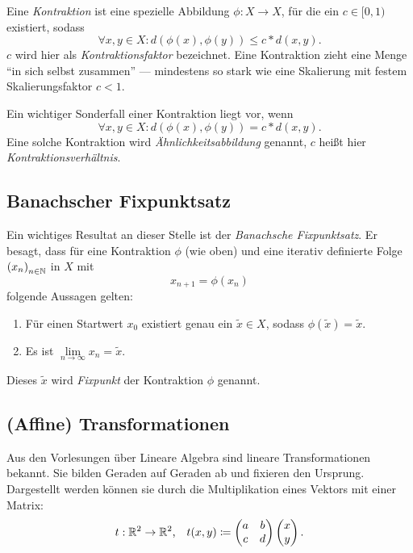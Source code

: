 \documentclass[afourpaper]{tufte-handout}
\begin{document}
Eine \emph{Kontraktion} ist eine spezielle Abbildung \( \phi: X \to X \), für die ein \( c \in [0,1) \) existiert, sodass
\begin{equation*}
  \forall x,y \in X : d(\phi(x), \phi(y)) \bm{\leq} c * d(x,y)\text{.}
\end{equation*}
\( c \) wird hier als \emph{Kontraktionsfaktor} bezeichnet.
Eine Kontraktion zieht eine Menge ``in sich selbst zusammen'' --- mindestens so stark wie eine Skalierung mit festem Skalierungsfaktor \( c < 1 \).

Ein wichtiger Sonderfall einer Kontraktion liegt vor, wenn
\begin{equation*}
  \forall x,y \in X : d(\phi(x), \phi(y)) \bm{=} c * d(x,y)\text{.}
\end{equation*}
Eine solche Kontraktion wird \emph{Ähnlichkeitsabbildung} genannt, \( c \) heißt hier \emph{Kontraktionsverhältnis}.

\subsection{Banachscher Fixpunktsatz}

Ein wichtiges Resultat an dieser Stelle ist der \emph{Banachsche Fixpunktsatz}. Er besagt, dass für eine Kontraktion \( \phi \) (wie oben) und eine iterativ definierte Folge \( {(x_n)}_{n \in \mathbb{N}} \) in \( X \) mit
\begin{equation*}
  x_{n+1} = \phi(x_n)
\end{equation*}
folgende Aussagen gelten:
\begin{enumerate}
  \item Für einen  Startwert \( x_0 \) existiert genau ein \( \widetilde{x} \in X \), sodass \( \phi(\widetilde{x}) = \widetilde{x} \).
  \item Es ist \( \underset{n \to \infty}{\lim} x_n = \widetilde{x} \).
\end{enumerate}

Dieses \( \widetilde{x} \) wird \emph{Fixpunkt} der Kontraktion \( \phi \) genannt.

\subsection{(Affine) Transformationen}

Aus den Vorlesungen über Lineare Algebra sind lineare Transformationen bekannt. Sie bilden Geraden auf Geraden ab und fixieren den Ursprung. Dargestellt werden können sie durch die Multiplikation eines Vektors mit einer Matrix:
\begin{equation*}
  t: \mathbb{R}^2 \to \mathbb{R}^2\text{,} \quad t(x,y) \coloneqq \begin{pmatrix}
    a & b \\ c & d
  \end{pmatrix} \begin{pmatrix}
    x \\ y
  \end{pmatrix}\text{.}
\end{equation*}
\end{document}

